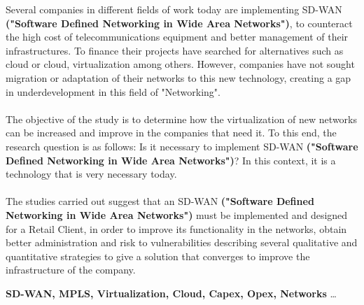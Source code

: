 Several companies in different fields of work today are implementing SD-WAN \textbf{("Software Defined Networking in Wide Area Networks")}, to counteract the high cost of telecommunications equipment and better management of their infrastructures. To finance their projects have searched for alternatives such as cloud or cloud, virtualization among others. However, companies have not sought migration or adaptation of their networks to this new technology, creating a gap in underdevelopment in this field of "Networking".
\\
\\
The objective of the study is to determine how the virtualization of new networks can be increased and improve in the companies that need it. To this end, the research question is as follows: Is it necessary to implement SD-WAN \textbf {("Software Defined Networking in Wide Area Networks")}? In this context, it is a technology that is very necessary today.
\\
\\
The studies carried out suggest that an SD-WAN \textbf {("Software Defined Networking in Wide Area Networks")} must be implemented and designed for a Retail Client, in order to improve its functionality in the networks, obtain better administration and risk to vulnerabilities describing several qualitative and quantitative strategies to give a solution that converges to improve the infrastructure of the company. 

\begin{keywords}
\textbf {SD-WAN, MPLS, Virtualization, Cloud, Capex, Opex, Networks} \ldots
\end{keywords}

